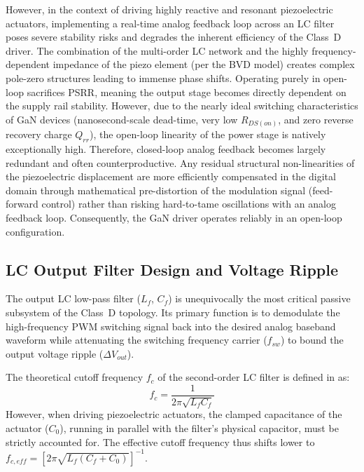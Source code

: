 \documentclass[10pt, conference, letterpaper]{IEEEtran}
\begin{document}
However, in the context of driving highly reactive and resonant piezoelectric actuators, implementing a real-time analog feedback loop across an LC filter poses severe stability risks and degrades the inherent efficiency of the Class~D driver. The combination of the multi-order LC network and the highly frequency-dependent impedance of the piezo element (per the BVD model) creates complex pole-zero structures leading to immense phase shifts. Operating purely in open-loop sacrifices PSRR, meaning the output stage becomes directly dependent on the supply rail stability. However, due to the nearly ideal switching characteristics of GaN devices (nanosecond-scale dead-time, very low $R_{DS(on)}$, and zero reverse recovery charge $Q_{rr}$), the open-loop linearity of the power stage is natively exceptionally high. Therefore, closed-loop analog feedback becomes largely redundant and often counterproductive. Any residual structural non-linearities of the piezoelectric displacement are more efficiently compensated in the digital domain through mathematical pre-distortion of the modulation signal (feed-forward control) rather than risking hard-to-tame oscillations with an analog feedback loop. Consequently, the GaN driver operates reliably in an open-loop configuration.

\subsection{LC Output Filter Design and Voltage Ripple}
The output LC low-pass filter ($L_f$, $C_f$) is unequivocally the most critical passive subsystem of the Class~D topology. Its primary function is to demodulate the high-frequency PWM switching signal back into the desired analog baseband waveform while attenuating the switching frequency carrier ($f_{sw}$) to bound the output voltage ripple ($\Delta V_{out}$).

The theoretical cutoff frequency $f_c$ of the second-order LC filter is defined in \cite{LC_filter_design} as:
\begin{equation}
f_c = \frac{1}{2\pi\sqrt{L_f C_f}}
\label{eq:lc_cutoff}
\end{equation}
However, when driving piezoelectric actuators, the clamped capacitance of the actuator ($C_0$), running in parallel with the filter's physical capacitor, must be strictly accounted for. The effective cutoff frequency thus shifts lower to $f_{c,eff} = [2\pi\sqrt{L_f (C_f + C_0)}]^{-1}$.
\end{document}

